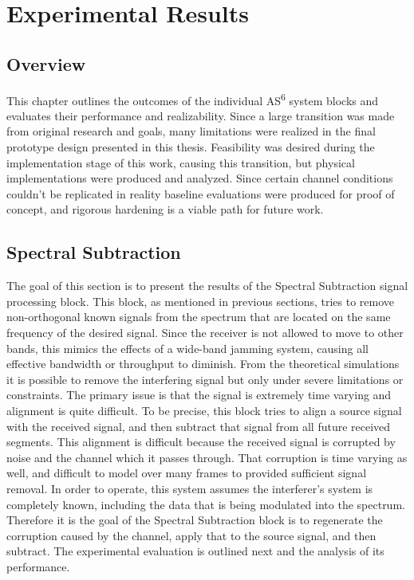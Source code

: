 \chapter{Experimental Results}
\label{ch:results}

\section{Overview}

This chapter outlines the outcomes of the individual AS\textsuperscript{6} system blocks and evaluates their performance and realizability.  Since a large transition was made from original research and goals, many limitations were realized in the final prototype design presented in this thesis.  Feasibility was desired during the implementation stage of this work, causing this transition, but physical implementations were produced and analyzed.  Since certain channel conditions couldn't be replicated in reality baseline evaluations were produced for proof of concept, and rigorous hardening is a viable path for future work.\\ 

\section{Spectral Subtraction}

The goal of this section is to present the results of the Spectral Subtraction signal processing block.  This block, as mentioned in previous sections, tries to remove non-orthogonal known signals from the spectrum that are located on the same frequency of the desired signal.  Since the receiver is not allowed to move to other bands, this mimics the effects of a wide-band jamming system, causing all effective bandwidth or throughput to diminish.  From the theoretical simulations it is possible to remove the interfering signal but only under severe limitations or constraints.  The primary issue is that the signal is extremely time varying and alignment is quite difficult.  To be precise, this block tries to align a source signal with the received signal, and then subtract that signal from all future received segments. This alignment is difficult because the received signal is corrupted by noise and the channel which it passes through. That corruption is time varying as well, and difficult to model over many frames to provided sufficient signal removal.  In order to operate, this system assumes the interferer's system is completely known, including the data that is being modulated into the spectrum.  Therefore it is the goal of the Spectral Subtraction block is to regenerate the corruption caused by the channel, apply that to the source signal, and then subtract.  The experimental evaluation is outlined next and the analysis of its performance.\\

